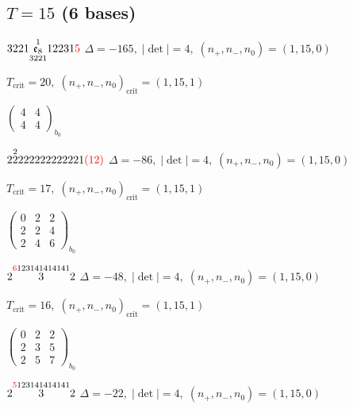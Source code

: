 \documentclass[10pt]{article}
\begin{document}
\subsection*{$T = 15$ \quad (6 bases)}
\smallskip

$3221\overset{1}{\underset{3221}{\mathfrak{e}_8}}12231\textcolor{red}{5}$ \quad $\Delta=-165,\; |\det|=4,\; (n_+,n_-,n_0)=(1,15,0)$

\hspace{1em}$T_{\text{crit}}=20,\; (n_+,n_-,n_0)_{\text{crit}}=(1,15,1)$

\hspace{2em}$\left(\begin{smallmatrix}4 & 4 \\ 4 & 4\end{smallmatrix}\right)_{\!b_0}$

\smallskip

$2\overset{2}{2}222222222221\textcolor{red}{(12)}$ \quad $\Delta=-86,\; |\det|=4,\; (n_+,n_-,n_0)=(1,15,0)$

\hspace{1em}$T_{\text{crit}}=17,\; (n_+,n_-,n_0)_{\text{crit}}=(1,15,1)$

\hspace{2em}$\left(\begin{smallmatrix}0 & 2 & 2 \\ 2 & 2 & 4 \\ 2 & 4 & 6\end{smallmatrix}\right)_{\!b_0}$

\smallskip

$2\overset{\textcolor{red}{6}123141414141}{3}2$ \quad $\Delta=-48,\; |\det|=4,\; (n_+,n_-,n_0)=(1,15,0)$

\hspace{1em}$T_{\text{crit}}=16,\; (n_+,n_-,n_0)_{\text{crit}}=(1,15,1)$

\hspace{2em}$\left(\begin{smallmatrix}0 & 2 & 2 \\ 2 & 3 & 5 \\ 2 & 5 & 7\end{smallmatrix}\right)_{\!b_0}$

$2\overset{\textcolor{red}{5}123141414141}{3}2$ \quad $\Delta=-22,\; |\det|=4,\; (n_+,n_-,n_0)=(1,15,0)$
\end{document}
